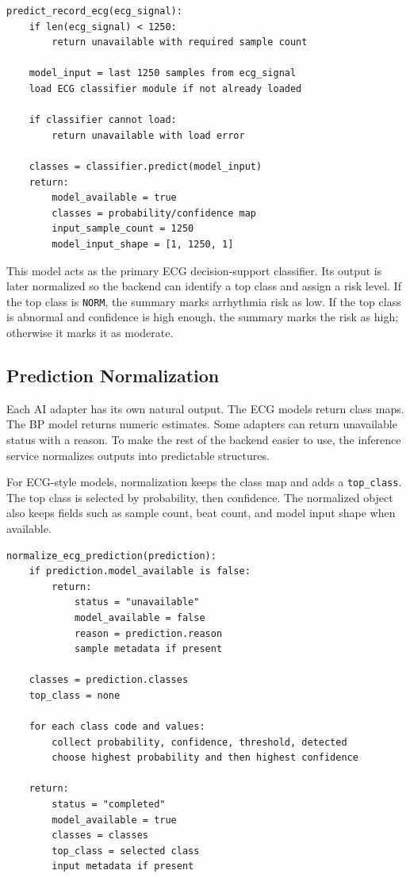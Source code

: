 \begin{lstlisting}[caption={Pseudocode for record-level ECG inference}]
predict_record_ecg(ecg_signal):
    if len(ecg_signal) < 1250:
        return unavailable with required sample count

    model_input = last 1250 samples from ecg_signal
    load ECG classifier module if not already loaded

    if classifier cannot load:
        return unavailable with load error

    classes = classifier.predict(model_input)
    return:
        model_available = true
        classes = probability/confidence map
        input_sample_count = 1250
        model_input_shape = [1, 1250, 1]
\end{lstlisting}

This model acts as the primary ECG decision-support classifier. Its output is later normalized so the backend can identify a top class and assign a risk level. If the top class is \texttt{NORM}, the summary marks arrhythmia risk as low. If the top class is abnormal and confidence is high enough, the summary marks the risk as high; otherwise it marks it as moderate.

\subsection{Prediction Normalization}

Each AI adapter has its own natural output. The ECG models return class maps. The BP model returns numeric estimates. Some adapters can return unavailable status with a reason. To make the rest of the backend easier to use, the inference service normalizes outputs into predictable structures.

For ECG-style models, normalization keeps the class map and adds a \texttt{top\_class}. The top class is selected by probability, then confidence. The normalized object also keeps fields such as sample count, beat count, and model input shape when available.

\begin{lstlisting}[caption={Pseudocode for normalizing ECG model output}]
normalize_ecg_prediction(prediction):
    if prediction.model_available is false:
        return:
            status = "unavailable"
            model_available = false
            reason = prediction.reason
            sample metadata if present

    classes = prediction.classes
    top_class = none

    for each class code and values:
        collect probability, confidence, threshold, detected
        choose highest probability and then highest confidence

    return:
        status = "completed"
        model_available = true
        classes = classes
        top_class = selected class
        input metadata if present
\end{lstlisting}

